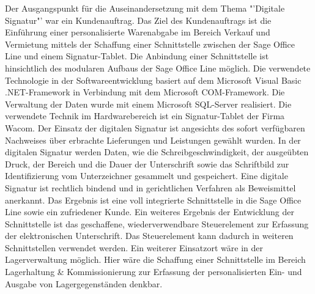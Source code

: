 Der Ausgangspunkt für die Auseinandersetzung mit dem Thema "'Digitale Signatur"' war ein Kundenauftrag. Das Ziel des Kundenauftrags ist die Einführung einer personalisierte Warenabgabe im Bereich Verkauf und Vermietung mittels der Schaffung einer Schnittstelle zwischen der Sage Office Line und einem Signatur-Tablet.
\newline
Die Anbindung einer Schnittstelle ist hinsichtlich des modularen Aufbaus der Sage Office Line möglich. Die verwendete Technologie in der Softwareentwicklung basiert auf dem Microsoft Visual Basic .NET-Framework in Verbindung mit dem Microsoft COM-Framework. Die Verwaltung der Daten wurde mit einem Microsoft SQL-Server realisiert. Die verwendete Technik im Hardwarebereich ist ein Signatur-Tablet der Firma Wacom. Der Einsatz der digitalen Signatur ist angesichts des sofort verfügbaren Nachweises über erbrachte Lieferungen und Leistungen gewählt wurden. In der digitalen Signatur werden Daten, wie die Schreibgeschwindigkeit, der ausgeübten Druck, der Bereich und die Dauer der Unterschrift sowie das Schriftbild zur Identifizierung vom Unterzeichner gesammelt und gespeichert. Eine digitale Signatur ist rechtlich bindend und in gerichtlichen Verfahren als Beweismittel anerkannt. 
\newline
Das Ergebnis ist eine voll integrierte Schnittstelle in die Sage Office Line sowie ein zufriedener Kunde. Ein weiteres Ergebnis der Entwicklung der Schnittstelle ist das geschaffene, wiederverwendbare Steuerelement zur Erfassung der elektronischen Unterschrift. Das Steuerelement kann dadurch in weiteren Schnittstellen verwendet werden. Ein weiterer Einsatzort wäre in der Lagerverwaltung möglich. Hier wäre die Schaffung einer Schnittstelle im Bereich Lagerhaltung \& Kommissionierung zur Erfassung der personalisierten Ein- und Ausgabe von Lagergegenständen denkbar.